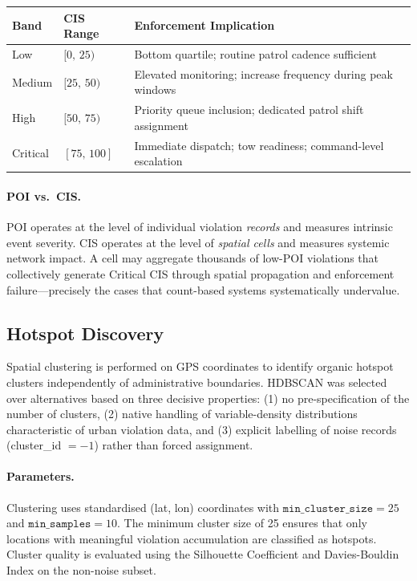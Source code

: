 \documentclass[12pt,a4paper]{article}
\begin{document}
\begin{center}
\small
\begin{tabular}{@{}llp{7.5cm}@{}}
\toprule
\textbf{Band} & \textbf{CIS Range} & \textbf{Enforcement Implication}\\
\midrule
Low      & $[0,\,25)$   & Bottom quartile; routine patrol cadence sufficient\\
Medium   & $[25,\,50)$  & Elevated monitoring; increase frequency during peak windows\\
High     & $[50,\,75)$  & Priority queue inclusion; dedicated patrol shift assignment\\
Critical & $[75,\,100]$ & Immediate dispatch; tow readiness; command-level escalation\\
\bottomrule
\end{tabular}
\end{center}

\paragraph{POI vs.\ CIS.}
POI operates at the level of individual violation \emph{records} and measures intrinsic event
severity. CIS operates at the level of \emph{spatial cells} and measures systemic network
impact. A cell may aggregate thousands of low-POI violations that collectively generate
Critical CIS through spatial propagation and enforcement failure—precisely the cases that
count-based systems systematically undervalue.


\subsection{Hotspot Discovery}

Spatial clustering is performed on GPS coordinates to identify organic hotspot clusters
independently of administrative boundaries. HDBSCAN was selected over alternatives based on
three decisive properties: (1) no pre-specification of the number of clusters, (2) native
handling of variable-density distributions characteristic of urban violation data, and
(3) explicit labelling of noise records (cluster\_id $= -1$) rather than forced assignment.

\paragraph{Parameters.}
Clustering uses standardised (lat, lon) coordinates with
$\texttt{min\_cluster\_size}=25$ and $\texttt{min\_samples}=10$.
The minimum cluster size of 25 ensures that only locations with meaningful violation
accumulation are classified as hotspots. Cluster quality is evaluated using the Silhouette
Coefficient and Davies-Bouldin Index on the non-noise subset.
\end{document}
